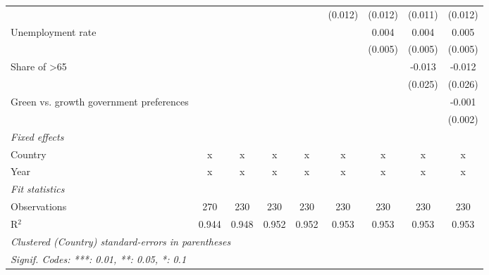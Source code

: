 \begin{table}[htbp]
\begin{tabular}{lcccccccc}
                                                             &         &         &               &               & (0.012)       & (0.012)       & (0.011)       & (0.012)\\   
      Unemployment rate                                      &         &         &               &               &               & 0.004         & 0.004         & 0.005\\   
                                                             &         &         &               &               &               & (0.005)       & (0.005)       & (0.005)\\   
      Share of >65                                           &         &         &               &               &               &               & -0.013        & -0.012\\   
                                                             &         &         &               &               &               &               & (0.025)       & (0.026)\\   
      Green vs. growth government preferences                &         &         &               &               &               &               &               & -0.001\\   
                                                             &         &         &               &               &               &               &               & (0.002)\\   
      \emph{Fixed effects}\\
      Country                                                & x       & x       & x             & x             & x             & x             & x             & x\\  
      Year                                                   & x       & x       & x             & x             & x             & x             & x             & x\\  
      \midrule \emph{Fit statistics}\\
      Observations                                           & 270     & 230     & 230           & 230           & 230           & 230           & 230           & 230\\  
      R$^2$                                                  & 0.944   & 0.948   & 0.952         & 0.952         & 0.953         & 0.953         & 0.953         & 0.953\\  
      \midrule
      \multicolumn{9}{l}{\emph{Clustered (Country) standard-errors in parentheses}}\\
      \multicolumn{9}{l}{\emph{Signif. Codes: ***: 0.01, **: 0.05, *: 0.1}}\\
   \end{tabular}
\end{table}


